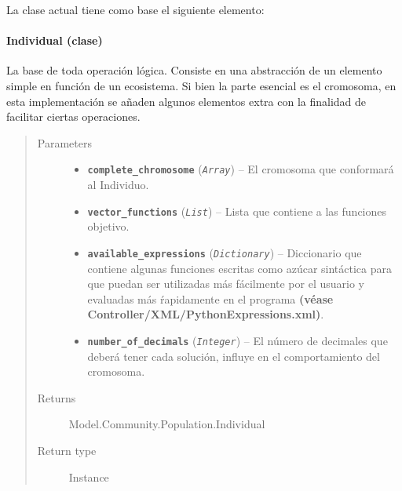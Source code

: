 \documentclass[class=report, crop=false]{standalone}
\begin{document}
\begin{fulllineitems}
\begin{fulllineitems}
\end{fulllineitems}

\end{fulllineitems}

La clase actual tiene como base el siguiente 
elemento:

\paragraph{Individual (clase)}
\label{sec:a_2_2_1_1}

\begin{fulllineitems}

\begin{DUlineblock}{0em}
\item[] La base de toda operación lógica.\break
Consiste en una abstracción de un elemento simple en función
de un ecosistema.\break
Si bien la parte esencial es el cromosoma, en esta implementación 
se añaden algunos elementos extra con la finalidad de facilitar 
ciertas operaciones.
\end{DUlineblock}

\begin{quote}\begin{description}
\item[{Parameters}] \leavevmode\begin{itemize}
\item \textbf{\texttt{complete\_chromosome}} (\emph{\texttt{Array}}) -- El cromosoma que conformará al Individuo.
\item \textbf{\texttt{vector\_functions}} (\emph{\texttt{List}}) -- Lista que contiene a las funciones objetivo.
\item \textbf{\texttt{available\_expressions}} (\emph{\texttt{Dictionary}}) -- Diccionario que contiene algunas funciones escritas como azúcar sintáctica
para que puedan ser utilizadas más fácilmente por el usuario y evaluadas más ŕapidamente en el programa \textbf{(véase Controller/XML/PythonExpressions.xml)}.
\item \textbf{\texttt{number\_of\_decimals}} (\emph{\texttt{Integer}}) -- El número de decimales que deberá tener cada solución, influye en el
comportamiento del cromosoma.
\end{itemize}
\item[{Returns}] \leavevmode
Model.Community.Population.Individual
\item[{Return type}] \leavevmode
Instance
\end{description}\end{quote}


\end{fulllineitems}
\end{document}
